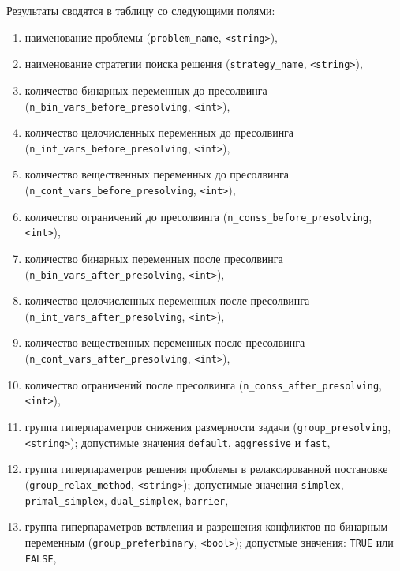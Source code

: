 \documentclass[%
	11pt,
	a4paper,
	utf8,
		]{article}
\begin{document}
Результаты сводятся в таблицу со следующими полями:
\begin{enumerate}
	\item наименование проблемы (\verb|problem_name|, \verb|<string>|),
	
	\item наименование стратегии поиска решения (\verb|strategy_name|, \verb|<string>|),
	
	\item количество бинарных переменных до пресолвинга (\verb|n_bin_vars_before_presolving|, \verb|<int>|),
	
	\item количество целочисленных переменных до пресолвинга (\verb|n_int_vars_before_presolving|, \verb|<int>|),
	
	\item количество вещественных переменных до пресолвинга (\verb|n_cont_vars_before_presolving|, \verb|<int>|),
	
	\item количество ограничений до пресолвинга (\verb|n_conss_before_presolving|, \verb|<int>|),
	
	\item количество бинарных переменных после пресолвинга (\verb|n_bin_vars_after_presolving|, \verb|<int>|),
	
	\item количество целочисленных переменных после пресолвинга (\verb|n_int_vars_after_presolving|, \verb|<int>|),
	
	\item количество вещественных переменных после пресолвинга (\verb|n_cont_vars_after_presolving|, \verb|<int>|),
	
	\item количество ограничений после пресолвинга (\verb|n_conss_after_presolving|, \verb|<int>|),
	
	\item группа гиперпараметров снижения размерности задачи (\verb|group_presolving|, \verb|<string>|); допустимые значения \verb|default|, \verb|aggressive| и \verb|fast|,
	
	\item группа гиперпараметров решения проблемы в релаксированной постановке (\verb|group_relax_method|, \verb|<string>|); допустимые значения \verb|simplex|, \verb|primal_simplex|, \verb|dual_simplex|, \verb|barrier|,
	
	\item группа гиперпараметров ветвления и разрешения конфликтов по бинарным переменным (\verb|group_preferbinary|, \verb|<bool>|); допустмые значения: \verb|TRUE| или \verb|FALSE|,
	

\end{enumerate}
\end{document}
